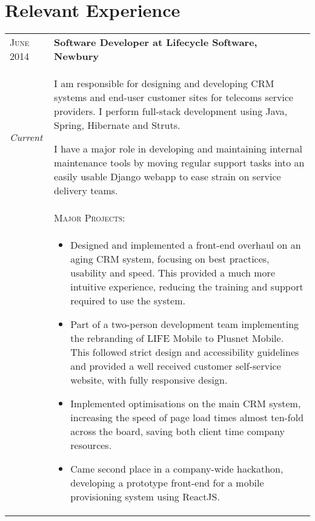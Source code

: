 \section{Relevant Experience}
\begin{tabular}{p{60pt}|p{11cm}}
	\hspace*{\fill}\textsc{June 2014} & \textbf{Software Developer at Lifecycle Software, Newbury} \\
	
	\hspace*{\fill}\emph{Current} & \footnotesize{
		I am responsible for designing and developing CRM systems and end-user customer sites for telecoms service providers. I perform full-stack development using Java, Spring, Hibernate and Struts.

		I have a major role in developing and maintaining internal maintenance tools by moving regular support tasks into an easily usable Django webapp to ease strain on service delivery teams.
	} \\

	\ & \vspace{1pt}\textsc{Major Projects}: \\

	&\vspace{-0.9em}\begin{itemize}[itemsep=0pt,topsep=0pt,leftmargin=*]\footnotesize
		\item Designed and implemented a front-end overhaul on an aging CRM system, focusing on best practices, usability and speed. This provided a much more intuitive experience, reducing the training and support required to use the system.
		\item Part of a two-person development team implementing the rebranding of LIFE Mobile to Plusnet Mobile. This followed strict design and accessibility guidelines and provided a well received customer self-service website, with fully responsive design. 
		\item Implemented optimisations on the main CRM system, increasing the speed of page load times almost ten-fold across the board, saving both client time company resources.
		\item Came second place in a company-wide hackathon, developing a prototype front-end for a mobile provisioning system using ReactJS.
	\end{itemize}\vspace{-1.5em}

\end{tabular}